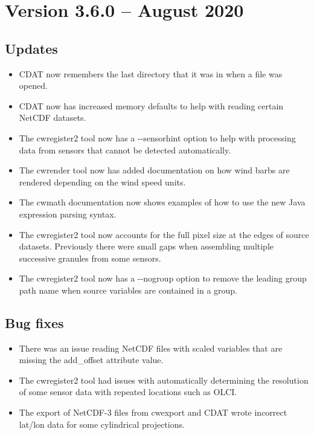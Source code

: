 
\section{Version 3.6.0 -- August 2020}

\subsection*{ Updates}

\begin{itemize}

  \item CDAT now remembers the last directory that it was in when a file
  was opened.
  
  \item CDAT now has increased memory defaults to help with reading
  certain NetCDF datasets.
  
  \item The cwregister2 tool now has a -{-}sensorhint option to help with
  processing data from sensors that cannot be detected automatically.
  
  \item The cwrender tool now has added documentation on how wind barbs
  are rendered depending on the wind speed units.
  
  \item The cwmath documentation now shows examples of how to use the new
  Java expression parsing syntax.
    
  \item The cwregister2 tool now accounts for the full pixel size at the edges
  of source datasets.  Previously there were small gaps when assembling
  multiple successive granules from some sensors.
  
  \item The cwregister2 tool now has a -{-}nogroup option to remove
  the leading group path name when source variables are contained in a group.

\end{itemize}

\subsection*{ Bug fixes}
\begin{itemize}

  \item There was an issue reading NetCDF files with scaled variables that are
  missing the add\_offset attribute value.

  \item The cwregister2 tool had issues with automatically determining the
  resolution of some sensor data with repeated locations such as OLCI.
  
  \item The export of NetCDF-3 files from cwexport and CDAT wrote incorrect
  lat/lon data for some cylindrical projections.

\end{itemize}


